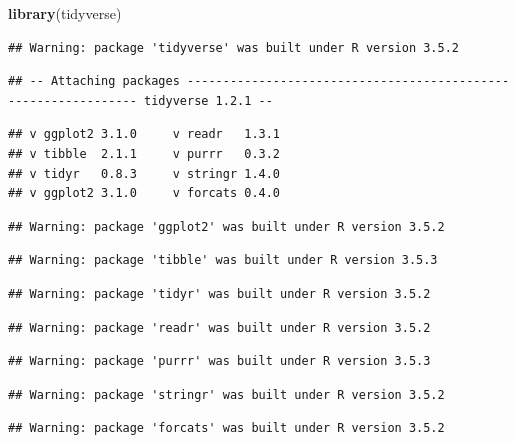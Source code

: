 \documentclass[]{article}
\newenvironment{Shaded}{\begin{snugshade}}{\end{snugshade}}
\newcommand{\KeywordTok}[1]{\textcolor[rgb]{0.13,0.29,0.53}{\textbf{#1}}}
\newcommand{\NormalTok}[1]{#1}
\begin{document}
\begin{Shaded}
\begin{Highlighting}[]
\KeywordTok{library}\NormalTok{(tidyverse)}
\end{Highlighting}
\end{Shaded}

\begin{verbatim}
## Warning: package 'tidyverse' was built under R version 3.5.2
\end{verbatim}

\begin{verbatim}
## -- Attaching packages --------------------------------------------------------------- tidyverse 1.2.1 --
\end{verbatim}

\begin{verbatim}
## v ggplot2 3.1.0     v readr   1.3.1
## v tibble  2.1.1     v purrr   0.3.2
## v tidyr   0.8.3     v stringr 1.4.0
## v ggplot2 3.1.0     v forcats 0.4.0
\end{verbatim}

\begin{verbatim}
## Warning: package 'ggplot2' was built under R version 3.5.2
\end{verbatim}

\begin{verbatim}
## Warning: package 'tibble' was built under R version 3.5.3
\end{verbatim}

\begin{verbatim}
## Warning: package 'tidyr' was built under R version 3.5.2
\end{verbatim}

\begin{verbatim}
## Warning: package 'readr' was built under R version 3.5.2
\end{verbatim}

\begin{verbatim}
## Warning: package 'purrr' was built under R version 3.5.3
\end{verbatim}

\begin{verbatim}
## Warning: package 'stringr' was built under R version 3.5.2
\end{verbatim}

\begin{verbatim}
## Warning: package 'forcats' was built under R version 3.5.2
\end{verbatim}
\end{document}
